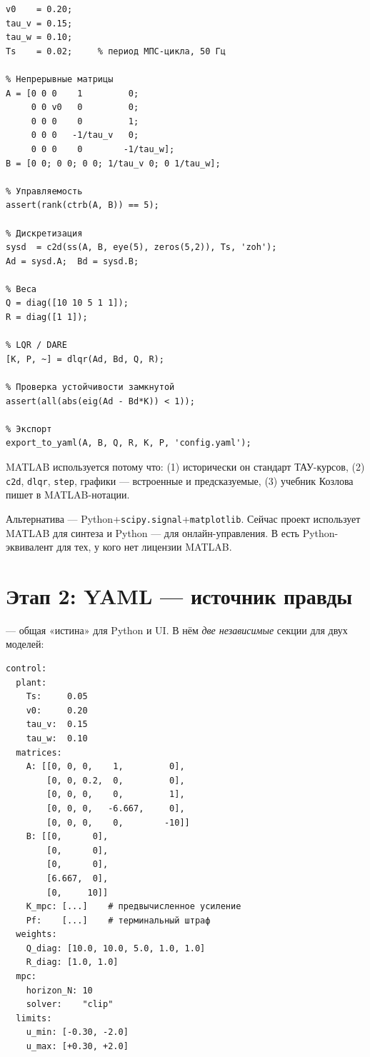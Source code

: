\begin{codebox}[title={\filepath{matlab/main.m} (упрощённый эскиз)}]
\begin{lstlisting}[style=matlabstyle]
% Параметры объекта
v0    = 0.20;
tau_v = 0.15;
tau_w = 0.10;
Ts    = 0.02;     % период МПС-цикла, 50 Гц

% Непрерывные матрицы
A = [0 0 0    1         0;
     0 0 v0   0         0;
     0 0 0    0         1;
     0 0 0   -1/tau_v   0;
     0 0 0    0        -1/tau_w];
B = [0 0; 0 0; 0 0; 1/tau_v 0; 0 1/tau_w];

% Управляемость
assert(rank(ctrb(A, B)) == 5);

% Дискретизация
sysd  = c2d(ss(A, B, eye(5), zeros(5,2)), Ts, 'zoh');
Ad = sysd.A;  Bd = sysd.B;

% Веса
Q = diag([10 10 5 1 1]);
R = diag([1 1]);

% LQR / DARE
[K, P, ~] = dlqr(Ad, Bd, Q, R);

% Проверка устойчивости замкнутой
assert(all(abs(eig(Ad - Bd*K)) < 1));

% Экспорт
export_to_yaml(A, B, Q, R, K, P, 'config.yaml');
\end{lstlisting}
\end{codebox}

\begin{notebox}
MATLAB используется потому что: (1) исторически он стандарт ТАУ-курсов,
(2) \texttt{c2d}, \texttt{dlqr}, \texttt{step}, графики --- встроенные
и предсказуемые, (3) учебник Козлова пишет в MATLAB-нотации.

Альтернатива --- Python+\texttt{scipy.signal}+\texttt{matplotlib}. Сейчас
проект использует MATLAB для синтеза и Python --- для онлайн-управления.
В  есть Python-эквивалент для тех, у кого нет лицензии
MATLAB.
\end{notebox}

\section{Этап 2: YAML --- источник правды}

 --- общая «истина» для Python и UI. В нём
\emph{две независимые} секции для двух моделей:

\begin{codebox}[title={\filepath{config.yaml}, секция \texttt{control} (легаси)}]
\begin{verbatim}
control:
  plant:
    Ts:     0.05
    v0:     0.20
    tau_v:  0.15
    tau_w:  0.10
  matrices:
    A: [[0, 0, 0,    1,         0],
        [0, 0, 0.2,  0,         0],
        [0, 0, 0,    0,         1],
        [0, 0, 0,   -6.667,     0],
        [0, 0, 0,    0,        -10]]
    B: [[0,      0],
        [0,      0],
        [0,      0],
        [6.667,  0],
        [0,     10]]
    K_mpc: [...]    # предвычисленное усиление
    Pf:    [...]    # терминальный штраф
  weights:
    Q_diag: [10.0, 10.0, 5.0, 1.0, 1.0]
    R_diag: [1.0, 1.0]
  mpc:
    horizon_N: 10
    solver:    "clip"
  limits:
    u_min: [-0.30, -2.0]
    u_max: [+0.30, +2.0]
\end{verbatim}
\end{codebox}

